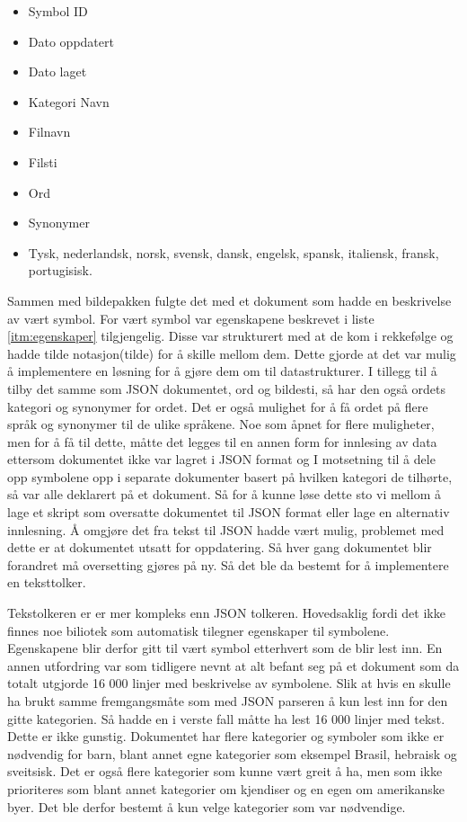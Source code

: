 {\begin{itemize}
\label{itm:egenskaper}
\item Symbol ID
\item Dato oppdatert
\item Dato laget
\item Kategori Navn 
\item Filnavn
\item Filsti
\item Ord
\item Synonymer
\item Tysk, nederlandsk, norsk, svensk, dansk, engelsk, spansk, italiensk, fransk, portugisisk.
\end{itemize}


Sammen med bildepakken fulgte det med et dokument som hadde en beskrivelse av vært symbol. For vært symbol var egenskapene beskrevet i liste \ref{itm:egenskaper} tilgjengelig. Disse var strukturert med at de kom i rekkefølge og hadde tilde notasjon(tilde) for å skille mellom dem. Dette gjorde at det var mulig å implementere en løsning for å gjøre dem om til datastrukturer. I tillegg til å tilby det samme som JSON dokumentet, ord og bildesti, så har den også ordets kategori og synonymer for ordet. Det er også mulighet for å få ordet på flere språk og synonymer til de ulike språkene. Noe som åpnet for flere muligheter, men for å få til dette, måtte det legges til en annen form for innlesing av data ettersom dokumentet ikke var lagret i JSON format og I motsetning til å dele opp symbolene opp i separate dokumenter basert på hvilken kategori de tilhørte, så var alle deklarert på et dokument. Så for å kunne løse dette sto vi mellom å lage et skript som oversatte dokumentet til JSON format eller lage en alternativ innlesning. Å omgjøre det fra tekst til JSON hadde vært mulig, problemet med dette er at dokumentet utsatt for oppdatering. Så hver gang dokumentet blir forandret må oversetting gjøres på ny. Så det ble da bestemt for å implementere en teksttolker. 

Tekstolkeren er er mer kompleks enn JSON tolkeren. Hovedsaklig fordi det ikke finnes noe biliotek som automatisk tilegner egenskaper til symbolene. Egenskapene blir derfor gitt til vært symbol etterhvert som de blir lest inn. En annen utfordring var som tidligere nevnt at alt befant seg på et dokument som da totalt utgjorde 16 000 linjer med beskrivelse av symbolene. Slik at hvis en skulle ha brukt samme fremgangsmåte som med JSON parseren å kun lest inn for den gitte kategorien. Så hadde en i verste fall måtte ha lest 16 000 linjer med tekst. Dette er ikke gunstig. Dokumentet har flere kategorier og symboler som ikke er nødvendig for barn, blant annet egne kategorier som eksempel Brasil, hebraisk og sveitsisk. Det er også flere kategorier som kunne vært greit å ha, men som ikke prioriteres som blant annet kategorier om kjendiser og en egen om amerikanske byer. Det ble derfor bestemt å kun velge kategorier som var nødvendige.

}

